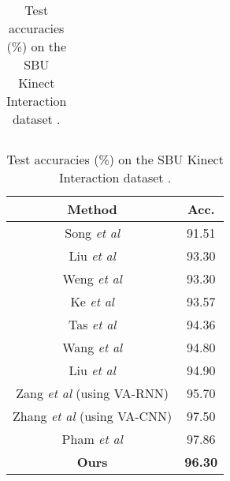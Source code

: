 \documentclass{bmvc2k}
\def\etal{\emph{et al}\bmvaOneDot}
\begin{document}
\begin{table}
{\begin{tabular}{ccccc}
\hline
\hline
\end{tabular}}
\hfill
\parbox{.45\linewidth}{
\centering
\caption{Test accuracies (\%) on the SBU Kinect Interaction dataset \cite{yun2012two}.}
\vspace*{-0.3cm}
\begin{tabular}{cc}
\label{table3}\\
\hline
\hspace*{0.01cm} {\scriptsize \textbf{Method}} & {\scriptsize \hspace*{0.3cm} \textbf{Acc.}} \\
\hline
{\scriptsize \hspace*{0.01cm} Song \etal \cite{Song2017AnES}} & {\scriptsize \hspace*{0.32cm} 91.51} \\
{\scriptsize \cellcolor{gray!30} Liu \etal \cite{Liu2016SpatioTemporalLW}} & {\scriptsize \cellcolor{gray!30}  \hspace*{0.25cm} 93.30}\\
{\scriptsize  \hspace*{0.01cm}  Weng \etal \cite{8322204}} & {\scriptsize   \hspace*{0.32cm} 93.30} \\
{\scriptsize   \cellcolor{gray!30} Ke \etal \cite{ke2017new}} & {\scriptsize \cellcolor{gray!30}  \hspace*{0.25cm} 93.57} \\
{\scriptsize   \hspace*{0.01cm} Tas \etal \cite{DBLP:conf/bmvc/TasK18}} & {\scriptsize  \hspace*{0.32cm} 94.36} \\
{\scriptsize \cellcolor{gray!30}   \hspace*{0.01cm} Wang \etal  \cite{Wang2017ModelingTD}} & {\scriptsize  \cellcolor{gray!30} \hspace*{0.32cm} 94.80} \\
{\scriptsize   \hspace*{0.01cm}  Liu \etal \cite{liu2018skeleton}} & {\scriptsize  \hspace*{0.32cm} 94.90}  \\
{\scriptsize \cellcolor{gray!30}   \hspace*{0.01cm} Zang \etal  \cite{zhang2019view} (using VA-RNN)} & {\scriptsize  \cellcolor{gray!30} \hspace*{0.32cm} 95.70} \\
{\scriptsize \hspace*{0.01cm} Zhang \etal  \cite{zhang2019view} (using VA-CNN)} & {\scriptsize   \hspace*{0.32cm} 97.50} \\
{\scriptsize \cellcolor{gray!30} \hspace*{0.01cm} Pham \etal  \cite{s19081932}} & {\scriptsize \cellcolor{gray!30}  \hspace*{0.32cm} 97.86} \\
\hline
{\scriptsize    \textbf{Ours} } & {\scriptsize   \hspace*{0.4cm} \textbf{96.30}}  \\
\hline
\hline
\end{tabular}}
\end{table}
\end{document}
